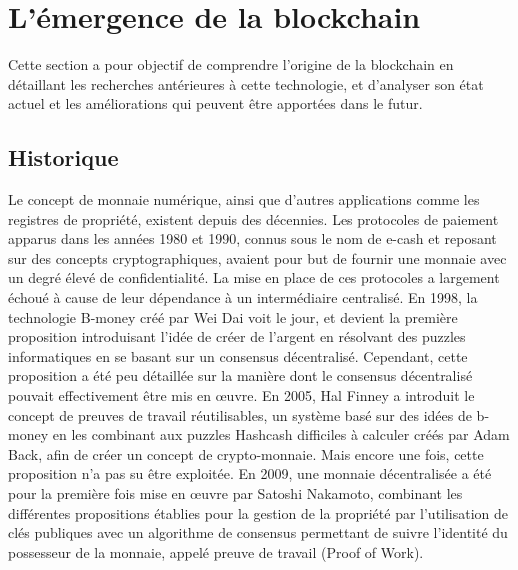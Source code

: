 \documentclass{tnreport}
\begin{document}
\section{L'émergence de la blockchain}

Cette section a pour objectif de comprendre l'origine de la blockchain en détaillant les recherches antérieures à cette technologie, et d'analyser son état actuel et les améliorations qui peuvent être apportées dans le futur.

\subsection{Historique}

Le concept de monnaie numérique, ainsi que d'autres applications comme les registres de propriété, existent depuis des décennies. 
Les protocoles de paiement apparus dans les années 1980 et 1990, connus sous le nom de e-cash\cite{ecash} et reposant sur des concepts cryptographiques, avaient pour but de fournir une monnaie avec un degré élevé de confidentialité. La mise en place de ces protocoles a largement échoué à cause de leur dépendance à un intermédiaire centralisé. 
En 1998, la technologie B-money\cite{bmoney} créé par Wei Dai voit le jour, et devient la première proposition introduisant l'idée de créer de l'argent en résolvant des puzzles informatiques en se basant sur un consensus décentralisé. Cependant, cette proposition a été peu détaillée sur la manière dont le consensus décentralisé pouvait effectivement être mis en œuvre. 
En 2005, Hal Finney a introduit le concept de preuves de travail réutilisables, un système basé sur des idées de b-money en les combinant aux puzzles Hashcash\cite{hashcash} difficiles à calculer créés par Adam Back, afin de créer un concept de crypto-monnaie. Mais encore une fois, cette proposition n'a pas su être exploitée. 
En 2009, une monnaie décentralisée a été pour la première fois mise en œuvre par Satoshi Nakamoto, combinant les différentes propositions établies pour la gestion de la propriété par l'utilisation de clés publiques avec un algorithme de consensus permettant de suivre l'identité du possesseur de la monnaie, appelé preuve de travail (Proof of Work).
\end{document}
